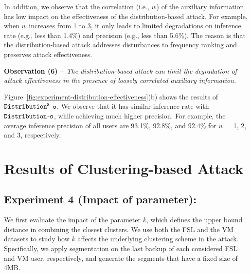 In addition, we observe that the correlation (i.e., $w$) of the auxiliary
information has low impact on the effectiveness of the distribution-based
attack.  For example, when $w$ increases from 1 to 3, it only leads to limited
degradations on inference rate (e.g., less than 1.4\%) and precision (e.g.,
less than 5.6\%). The reason is that the distribution-based attack addresses
disturbances to frequency ranking and preserves attack effectiveness.  

{\bf Observation (6) --} {\em The distribution-based attack can limit the
degradation of attack effectiveness in the presence of loosely correlated
auxiliary information.} 

 Figure~\ref{fig:experiment-distribution-effectiveness}(b) shows the results of $\tt Distribution^S$-$\tt o$. We observe that it has similar inference rate with $\tt Distribution$-$\tt o$,  
 while achieving much higher precision. For example, the average inference precision of all users are 93.1\%, 92.8\%, and 92.4\% for $w$ = 1, 2, and 3, respectively.  



\section{Results of Clustering-based Attack}
\label{sec:experiment-clustering}




\subsection{Experiment 4 (Impact of parameter):} We first evaluate the impact
of the parameter $k$, which defines the upper bound distance
in combining the closest clusters.  We use both the FSL and the VM datasets to
study how $k$ affects the underlying clustering scheme in the attack.
Specifically, we apply segmentation on the last backup of each considered FSL
and VM user, respectively, and generate the segments that have a fixed size of
4MB. 

